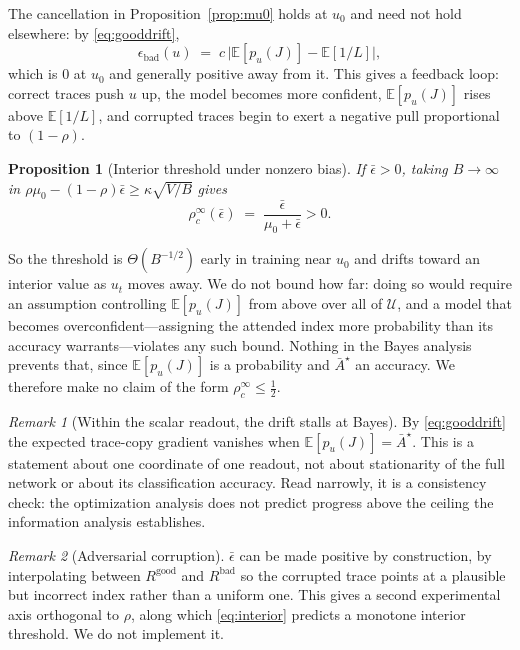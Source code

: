 \documentclass{article}
\theoremstyle{plain}
\newtheorem{proposition}{Proposition}
\theoremstyle{definition}
\theoremstyle{remark}
\newtheorem{remark}{Remark}
\newcommand{\E}{\mathbb{E}}
\newcommand{\1}{\mathbf{1}}
\newcommand{\cU}{\mathcal{U}}
\newcommand{\good}{\mathrm{good}}
\newcommand{\bad}{\mathrm{bad}}
\begin{document}
The cancellation in Proposition~\ref{prop:mu0} holds at $u_0$ and need not hold
elsewhere: by \eqref{eq:gooddrift},
\begin{equation}
\label{eq:bias}
\epsilon_\bad(u) \;=\; c\,\big|\E[p_u(J)] - \E[1/L]\big| ,
\end{equation}
which is $0$ at $u_0$ and generally positive away from it. This gives a feedback
loop: correct traces push $u$ up, the model becomes more confident,
$\E[p_u(J)]$ rises above $\E[1/L]$, and corrupted traces begin to exert a
negative pull proportional to $(1-\rho)$.

\begin{proposition}[Interior threshold under nonzero bias]
\label{prop:interior}
If $\bar\epsilon > 0$, taking $B\to\infty$ in
$\rho\mu_0 - (1-\rho)\bar\epsilon \ge \kappa\sqrt{V/B}$ gives
\begin{equation}
\label{eq:interior}
\rho_c^\infty(\bar\epsilon) \;=\; \frac{\bar\epsilon}{\mu_0 + \bar\epsilon} > 0 .
\end{equation}
\end{proposition}

So the threshold is $\Theta(B^{-1/2})$ early in training near $u_0$ and drifts
toward an interior value as $u_t$ moves away. We do not bound how far: doing so
would require an assumption controlling $\E[p_u(J)]$ from above over all of
$\cU$, and a model that becomes overconfident---assigning the attended index more
probability than its accuracy warrants---violates any such bound. Nothing in the
Bayes analysis prevents that, since $\E[p_u(J)]$ is a probability and
$\bar A^\star$ an accuracy. We therefore make no claim of the form
$\rho_c^\infty\le\frac12$.

\begin{remark}[Within the scalar readout, the drift stalls at Bayes]
\label{rem:stall}
By \eqref{eq:gooddrift} the expected trace-copy gradient vanishes when
$\E[p_u(J)] = \bar A^\star$. This is a statement about one coordinate of one
readout, not about stationarity of the full network or about its classification
accuracy. Read narrowly, it is a consistency check: the optimization analysis
does not predict progress above the ceiling the information analysis establishes.
\end{remark}

\begin{remark}[Adversarial corruption]
\label{rem:adversarial}
$\bar\epsilon$ can be made positive by construction, by interpolating between
$R^{\good}$ and $R^{\bad}$ so the corrupted trace points at a plausible but
incorrect index rather than a uniform one. This gives a second experimental axis
orthogonal to $\rho$, along which \eqref{eq:interior} predicts a monotone
interior threshold. We do not implement it.
\end{remark}
\end{document}
